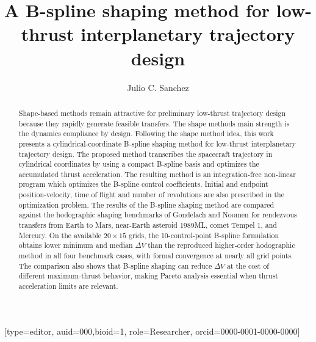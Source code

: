 \documentclass[a4paper,fleqn]{cas-sc}
\begin{document}
\let\WriteBookmarks\relax



\title [mode = title]{A B-spline shaping method for low-thrust interplanetary trajectory design}                      
\tnotemark[1,2]


\author[1]{Julio C. Sanchez}[type=editor,
                        auid=000,bioid=1,
                        role=Researcher,
                        orcid=0000-0001-0000-0000]
\cormark[1]
\fnmark[1]






\begin{abstract}
Shape-based methods remain attractive for preliminary low-thrust trajectory design because they rapidly generate feasible transfers. The shape methods main strength is the dynamics compliance by design. Following the shape method idea, this work presents a cylindrical-coordinate B-spline shaping method for low-thrust interplanetary trajectory design. The proposed method transcribes the spacecraft trajectory in cylindrical coordinates by using a compact B-spline basis and optimizes the accumulated thrust acceleration. The resulting method is an integration-free non-linear program which optimizes the B-spline control coefficients. Initial and endpoint position-velocity, time of flight and number of revolutions are also prescribed in the optimization problem. The results of the B-spline shaping method are compared against the hodographic shaping benchmarks of Gondelach and Noomen for rendezvous transfers from Earth to Mars, near-Earth asteroid 1989ML, comet Tempel 1, and Mercury. On the available \(20\times 15\) grids, the 10-control-point B-spline formulation obtains lower minimum and median \(\Delta V\) than the reproduced higher-order hodographic method in all four benchmark cases, with formal convergence at nearly all grid points. The comparison also shows that B-spline shaping can reduce \(\Delta V\) at the cost of different maximum-thrust behavior, making Pareto analysis essential when thrust acceleration limits are relevant.
\end{abstract}
\end{document}
